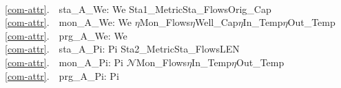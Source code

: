 %
\bp
{}\\
\ref{com-attr}.\ \ sta\_A\_We: We {\RIGHTARROW} Sta1\_Metric{\TIMES}Sta\_Flows{\TIMES}Orig\_Cap{\TIMES}{\DOTDOTDOT}\\
\ref{com-attr}.\ \ mon\_A\_We: We {\RIGHTARROW} $\eta$Mon\_Flows{\TIMES}$\eta$Well\_Cap{\TIMES}$\eta$In\_Temp{\TIMES}$\eta$Out\_Temp{\TIMES}{\DOTDOTDOT}\\
\ref{com-attr}.\ \ prg\_A\_We: We {\RIGHTARROW} {\DOTDOTDOT}\\
\ref{com-attr}.\ \ sta\_A\_Pi: Pi {\RIGHTARROW} Sta2\_Metric{\TIMES}Sta\_Flows{\TIMES}LEN{\TIMES}{\DOTDOTDOT}\\
\ref{com-attr}.\ \ mon\_A\_Pi: Pi {\RIGHTARROW} $\mathcal{N}$Mon\_Flows{\TIMES}$\eta$In\_Temp{\TIMES}$\eta$Out\_Temp{\TIMES}{\DOTDOTDOT} \\
\ref{com-attr}.\ \ prg\_A\_Pi: Pi {\RIGHTARROW} {\DOTDOTDOT} \\
